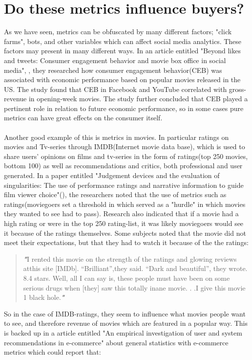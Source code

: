 \section{Do these metrics influence buyers?}
As we have seen, metrics can be obfuscated by many different factors; "click farms", bots, and other variables which can affect social media analytics. These factors may present in many different ways. In an article entitled "Beyond likes and tweets: Consumer engagement behavior and movie box office in social media", \cite{Oh2016}, they researched how consumer engagement behavior(CEB) was associated with economic performance based on popular movies released in the US. The study found that CEB in Facebook and YouTube correlated with gross-revenue in opening-week movies. The study further concluded that CEB played a pertinent role in relation to future economic performance, so in some cases pure metrics can have great effects on the consumer itself.
\\\\ Another good example of this is metrics in movies. In particular ratings on movies and Tv-series through IMDB(Internet movie data base), which is used to share users' opinions on films and tv-series in the form of ratings(top 250 movies, bottom 100) as well as recommendations and critics, both professional and user generated. In a paper entitled "Judgement devices and the evaluation of singularities: The use of performance ratings and narrative information to guide film viewer choice"(\cite{Bialecki2016}), the researchers noted that the use of metrics such as ratings(moviegoers set a threshold in which served as a "hurdle" in which movies they wanted to see had to pass). Research also indicated that if a movie had a high rating or were in the top 250 rating-list, it was likely moviegoers would see it because of the ratings themselves. Some subjects noted that the movie did not meet their expectations, but that they had to watch it because of the the ratings:
\newpage
\begin{quotation}
\textbf{\textit{"}}I rented this movie on the strength of the ratings and glowing
reviews atthis site [IMDb]. “Brilliant”,they said. “Dark and beautiful”,
they wrote. 8.4 stars. Well, all I can say is, these people
must have been on some serious drugs when [they] saw this
totally inane movie. . .I give this movie 1 black hole.\textbf{\textit{"}}
\newline \mbox{} \hfill \citet{Bialecki2016}
\end{quotation}
%
%
So in the case of IMDB-ratings, they seem to influence what movies people want to see, and therefore revenue of movies which are featured in a popular way. This is backed up in a article entitled "An empirical investigation of user and system recommendations in e-commerce" about general statistics with e-commerce metrics \cite{Lin2014111} which could report that:
